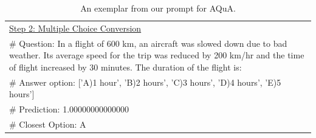 \begin{table}[!t]
{\begin{tabular}{p{\linewidth}}
        \vspace{2mm}

        \underline{Step 2: Multiple Choice Conversion}\\
        \# Question: In a flight of 600 km, an aircraft was slowed down due to bad weather. Its average speed for the trip was reduced by 200 km/hr and the time of flight increased by 30 minutes. The duration of the flight is: \\
        \vspace{-1mm}
        \# Answer option: ['A)1 hour', 'B)2 hours', 'C)3 hours', 'D)4 hours', 'E)5 hours'] \\
        \# Prediction: 1.00000000000000 \\
        \# Closest Option: A \\
        \bottomrule
    \end{tabular}
    }
        \caption{
    An exemplar from our prompt for AQuA.
    }
    \label{tab:appendix-AQUA_prompt}
\end{table}
\endgroup
